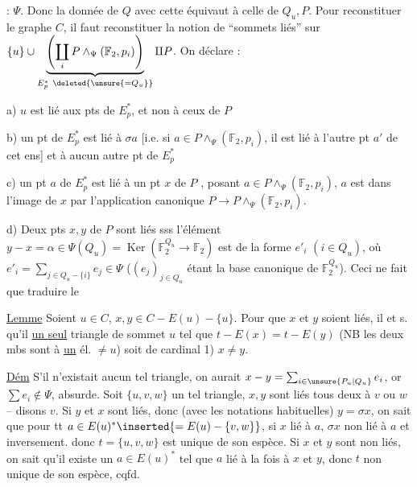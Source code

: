  : $\Psi$. Donc la donnée de  $Q$ avec cette  équivaut à celle de $Q_u,P$. Pour reconstituer le graphe $C$, il faut reconstituer la notion de ``sommets liés'' sur $\{u\}\cup\underbrace{\left(\coprod_i P\wedge_{\Psi}(\mathbb F_2,p_i)\right)}_{E_{p}^*\ \deleted{\unsure{=Q_u}}}\amalg P$. On déclare :

a) $u$ est lié aux pts de $E_p^*$, et non à ceux de $P$

b) un  pt  de $E_p^*$ est lié à $\sigma a$ [i.e. si $a\in P\wedge_{\Psi}(\mathbb F_2,p_i)$, il est lié à l'autre pt $a'$ de cet ens] et à aucun autre pt de $E_p^*$

c) un pt $a$ de $E_p^*$ est lié à un pt  $x$ de $P$ , posant $a\in P\wedge_{\Psi}(\mathbb F_2,p_i)$, $a$ est dans l'image de $x$ par l'application canonique $P\longrightarrow P\wedge_{\Psi}(\mathbb F_2,p_i)$.

d) Deux pts $x,y$ de $P$ sont liés sss l'élément $y-x=\alpha\in\Psi(Q_u)=\operatorname{Ker}(\mathbb F_{2}^{Q_u}\longrightarrow\mathbb F_2)$ est  de la forme  $e'_i$ $(i\in Q_u)$, où $e'_i=\sum_{j\in Q_u-\{i\}}e_j\in\Psi$ ($(e_j)_{j\in Q_u}$ étant la base canonique de $\mathbb F_2^{Q_u}$). Ceci ne fait que traduire le

\uline{Lemme} Soient $u\in C$, $x,y\in C-E(u)-\{u\}$. Pour que $x$ et $y$ soient liés, il  et s. qu'il       \uline{un seul} triangle de sommet $u$ tel que $t-E(x)=t-E(y)$ (NB les deux mbs sont   à \uline{un} él. $\ne u$) soit  de cardinal 1)  $x\ne y$.

\uline{Dém} S'il n'existait aucun tel triangle, on aurait $x-y=\sum_{i\in\unsure{P_u|Q_u}}e_i$, or $\sum e_i\notin\Psi$,  absurde. Soit $\{u,v,w\}$ un tel triangle,  $x,y$ sont liés tous deux à $v$ ou $w$ -- disons $v$. Si $y$ et $x$ sont liés, donc (avec les notations habituelles) $y=\sigma x$, on sait que pour tt $a\in E(u)^*\inserted{=E(u)-\{v,w\}}$, si $x$ lié à $a$, $\sigma x$ non lié à $a$ et inversement.
donc $t=\{u,v,w\}$ est unique de son espèce. Si $x$ et $y$ sont non liés, on sait qu'il existe un  $a\in E(u)^*$ tel que $a$ lié à la fois à $x$ et $y$, donc $t$ non unique de son espèce, cqfd.

